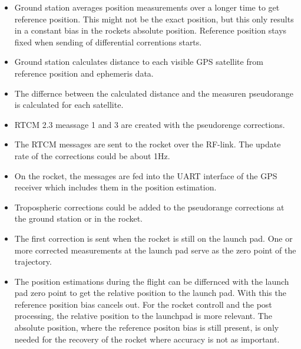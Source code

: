 \begin{itemize}
 \item Ground station averages position measurements over a longer time to get reference position. 
 This might not be the exact position, but this only results in a constant bias in the rockets absolute position. 
 Reference position stays fixed when sending of differential correntions starts.
 
 \item Ground station calculates distance to each visible GPS satellite from reference position and ephemeris data.
 
 \item The differnce between the calculated distance and the measuren pseudorange is calculated for each satellite.
 
 \item RTCM 2.3 meassage 1 and 3 are created with the pseudorenge corrections.
 
 \item The RTCM messages are sent to the rocket over the RF-link. 
 The update rate of the corrections could be about 1Hz.
 
 \item On the rocket, the messages are fed into the UART interface of the GPS receiver which includes them in the position estimation.
 
 \item Tropospheric corrections could be added to the pseudorange corrections at the ground station or in the rocket.
 
 \item The first correction is sent when the rocket is still on the launch pad.
 One or more corrected measurements at the launch pad serve as the zero point of the trajectory.
 
 \item The position estimations during the flight can be differnced with the launch pad zero point to get the relative position to the launch pad.
 With this the reference position bias cancels out.
 For the rocket controll and the post processing, the relative position to the launchpad is more relevant.
 The absolute position, where the reference positon bias is still present, is only needed for the recovery of the rocket where accuracy is not as important.
\end{itemize}